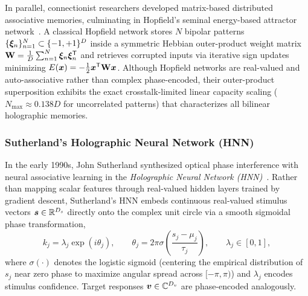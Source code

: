 In parallel, connectionist researchers developed matrix-based distributed associative memories, culminating in Hopfield's seminal energy-based attractor network~\cite{HOPFIELD_1982_ASSOCIATIVE}.
A classical Hopfield network stores $N$ bipolar patterns $\{\boldsymbol{\xi}_n\}_{n=1}^{N} \subset \{-1, +1\}^D$ inside a symmetric Hebbian outer-product weight matrix $\mathbf{W} = \frac{1}{D}\sum_{n=1}^{N} \boldsymbol{\xi}_n \boldsymbol{\xi}_n^{\mathsf{T}}$ and retrieves corrupted inputs via iterative sign updates minimizing $E(\boldsymbol{x}) = -\frac{1}{2}\boldsymbol{x}^{\mathsf{T}} \mathbf{W} \boldsymbol{x}$.
Although Hopfield networks are real-valued and auto-associative rather than complex phase-encoded, their outer-product superposition exhibits the exact crosstalk-limited linear capacity scaling ($N_{\max} \approx 0.138 D$ for uncorrelated patterns) that characterizes all bilinear holographic memories.

\subsubsection{Sutherland's Holographic Neural Network (HNN)}

In the early 1990s, John Sutherland synthesized optical phase interference with neural associative learning in the \emph{Holographic Neural Network (HNN)}~\cite{SUTHERLAND_1990_HNN}.
Rather than mapping scalar features through real-valued hidden layers trained by gradient descent, Sutherland's HNN embeds continuous real-valued stimulus vectors $\boldsymbol{s} \in \mathbb{R}^{D_s}$ directly onto the complex unit circle via a smooth sigmoidal phase transformation,
\begin{equation}\label{eq:sutherland_encoding}
    k_j = \lambda_j \exp\!\left(i \theta_j\right), \qquad
    \theta_j = 2\pi \sigma\!\left(\frac{s_j - \mu_j}{\tau_j}\right), \qquad
    \lambda_j \in [0, 1],
\end{equation}
where $\sigma(\cdot)$ denotes the logistic sigmoid (centering the empirical distribution of $s_j$ near zero phase to maximize angular spread across $[-\pi, \pi)$) and $\lambda_j$ encodes stimulus confidence.
Target responses $\boldsymbol{v} \in \mathbb{C}^{D_v}$ are phase-encoded analogously.

